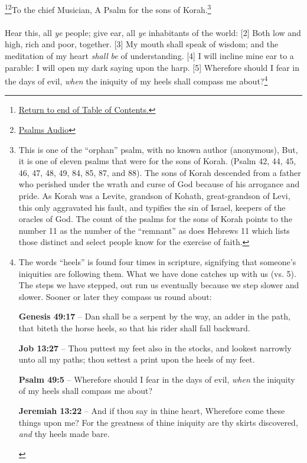 \footnote{\textcolor[cmyk]{0.99998,1,0,0}{\hyperlink{TOC}{Return to end of Table of Contents.}}}\footnote{\href{https://www.audioverse.org/english/audiobibles/books/ENGKJV/O/Ps/1}{\textcolor[cmyk]{0.99998,1,0,0}{Psalms Audio}}}\textcolor[cmyk]{0.99998,1,0,0}{To the chief Musician, A Psalm for the sons of Korah.}\footnote{This is one of the ``orphan'' psalm, with no known author (anonymous), But, it is one of eleven psalms that were for the sons of Korah. (Psalm 42, 44, 45, 46, 47, 48, 49, 84, 85, 87, and 88). The sons of Korah descended from a father who perished under the wrath and curse of God because of his arrogance and pride.   As Korah was a Levite, grandson of Kohath, great-grandson of Levi, this only aggravated his fault, and typifies the sin of Israel, keepers of the oracles of God. \cite{Phillips2001ExploringPsalms1} The count of the psalms for the sons of Korah points to the number 11 as the number of the ``remnant'' as does Hebrews 11 which lists those distinct and select people know for the exercise of faith.}\\
\\
\textcolor[cmyk]{0.99998,1,0,0}{Hear this, all \emph{ye} people; give ear, all \emph{ye} inhabitants of the world:}
[2] \textcolor[cmyk]{0.99998,1,0,0}{Both low and high, rich and poor, together.}
[3] \textcolor[cmyk]{0.99998,1,0,0}{My mouth shall speak of wisdom; and the meditation of my heart \emph{shall} \emph{be} of understanding.}
[4] \textcolor[cmyk]{0.99998,1,0,0}{I will incline mine ear to a parable: I will open my dark saying upon the harp.}
[5] \textcolor[cmyk]{0.99998,1,0,0}{Wherefore should I fear in the days of evil, \emph{when} the iniquity of my heels shall compass me about?}\footnote{The words ``heels'' is found four times in scripture, signifying that someone’s iniquities are following them. What we have done catches up with us (vs. 5). The steps we have stepped, out run us eventually because we step slower and slower. Sooner or later they compass us round about: \cite{Ruckman1992Psalms}
\begin{compactenum}
\item \textbf{Genesis 49:17} -- Dan shall be a serpent by the way, an adder in the path, that biteth the horse heels, so that his rider shall fall backward.
\item \textbf{Job 13:27} -- Thou puttest my feet also in the stocks, and lookest narrowly unto all my paths; thou settest a print upon the heels of my feet.
\item \textbf{Psalm 49:5} -- Wherefore should I fear in the days of evil, \emph{when} the iniquity of my heels shall compass me about?
\item \textbf{Jeremiah 13:22} -- And if thou say in thine heart, Wherefore come these things upon me? For the greatness of thine iniquity are thy skirts discovered, \emph{and} thy heels made bare.
\end{compactenum} }
